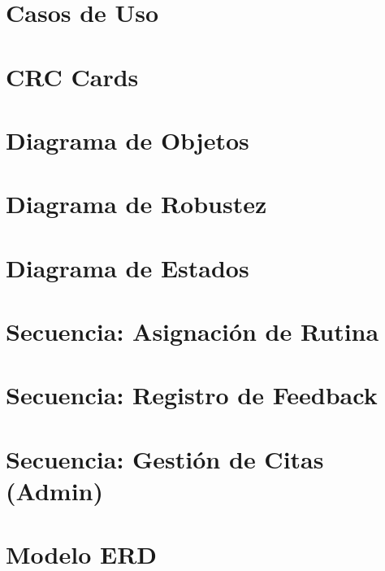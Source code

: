 \section{Casos de Uso}


\section{CRC Cards}


\section{Diagrama de Objetos}


\section{Diagrama de Robustez}


\section{Diagrama de Estados}


\section{Secuencia: Asignación de Rutina}


\section{Secuencia: Registro de Feedback}


\section{Secuencia: Gestión de Citas (Admin)}


\section{Modelo ERD}

